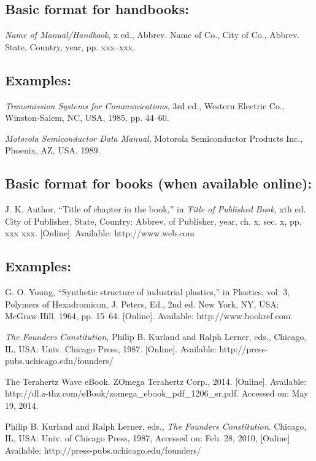 \documentclass[journal]{IEEEtran}
\begin{document}
\subsection*{Basic format for handbooks:}

{\em Name of Manual/Handbook}, x ed., Abbrev. Name of Co., City of Co., Abbrev. State, Country, year, pp. xxx--xxx.

\subsection*{Examples:}

\begin{thebibliography}{34}
\setcounter{enumiv}{7}

\bibitem{} {\em Transmission Systems for Communications}, 3rd ed., Western Electric Co., Winston-Salem, NC, USA, 1985, pp. 44--60.

\bibitem{} {\em Motorola Semiconductor Data Manual}, Motorola Semiconductor Products Inc., Phoenix, AZ, USA, 1989.
\end{thebibliography}

\subsection*{Basic format for books (when available online):}

J. K. Author, ``Title of chapter in the book,'' in {\em Title of Published Book}, xth ed. City of Publisher, State, Country: Abbrev. of Publisher, year, ch. x, sec. x, pp. xxx xxx. [Online]. Available: http://www.web.com 

\subsection*{Examples:}

\begin{thebibliography}{34}
\setcounter{enumiv}{9}

\bibitem{}G. O. Young, ``Synthetic structure of industrial plastics,'' in Plastics, vol. 3, Polymers of Hexadromicon, J. Peters, Ed., 2nd ed. New York, NY, USA: McGraw-Hill, 1964, pp. 15--64. [Online]. Available: http://www.bookref.com. 

\bibitem{} {\em The Founders Constitution}, Philip B. Kurland and Ralph Lerner, eds., Chicago, IL, USA: Univ. Chicago Press, 1987. [Online]. Available: http://press-pubs.uchicago.edu/founders/

\bibitem{} The Terahertz Wave eBook. ZOmega Terahertz Corp., 2014. [Online]. Available: http://dl.z-thz.com/eBook/zomega\_ebook\_pdf\_1206\_sr.pdf. Accessed on: May 19, 2014. 

\bibitem{} Philip B. Kurland and Ralph Lerner, eds., {\em The Founders Constitution}. Chicago, IL, USA: Univ. of Chicago Press, 1987, Accessed on: Feb. 28, 2010, [Online] Available: http://press-pubs.uchicago.edu/founders/ 
\end{thebibliography}
\end{document}
